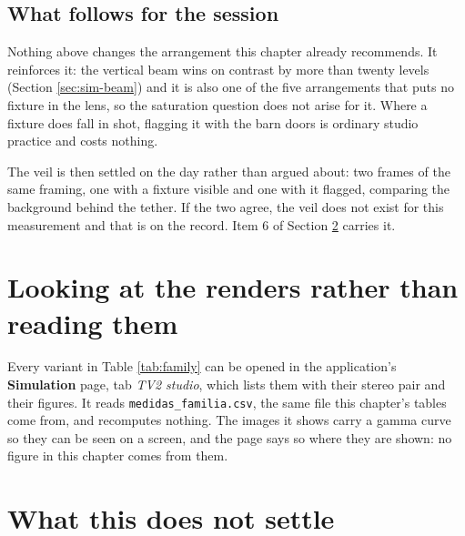 \subsection{What follows for the session}

Nothing above changes the arrangement this chapter already recommends. It
reinforces it: the vertical beam wins on contrast by more than twenty levels
(Section \ref{sec:sim-beam}) and it is also one of the five arrangements that
puts no fixture in the lens, so the saturation question does not arise for
it. Where a fixture does fall in shot, flagging it with the barn doors is
ordinary studio practice and costs nothing.

The veil is then settled on the day rather than argued about: two frames of
the same framing, one with a fixture visible and one with it flagged,
comparing the background behind the tether. If the two agree, the veil does
not exist for this measurement and that is on the record. Item 6 of Section
\ref{sec:sim-open} carries it.

\section{Looking at the renders rather than reading them}

Every variant in Table \ref{tab:family} can be opened in the
application's \textbf{Simulation} page, tab \emph{TV2 studio}, which lists
them with their stereo pair and their figures. It reads
\texttt{medidas\_familia.csv}, the same file this chapter's tables come
from, and recomputes nothing. The images it shows carry a gamma curve so
they can be seen on a screen, and the page says so where they are shown: no
figure in this chapter comes from them.

\section{What this does not settle}
\label{sec:sim-open}

